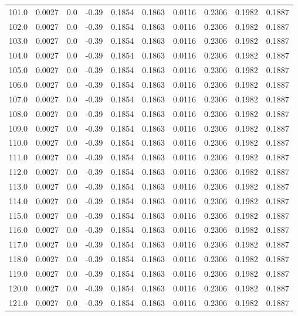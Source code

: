 \begin{longtable}{lrrrrrrrrr}
101.0 & 0.0027 & 0.0 & -0.39 & 0.1854 & 0.1863 & 0.0116 & 0.2306 & 0.1982 & 0.1887 \\
102.0 & 0.0027 & 0.0 & -0.39 & 0.1854 & 0.1863 & 0.0116 & 0.2306 & 0.1982 & 0.1887 \\
103.0 & 0.0027 & 0.0 & -0.39 & 0.1854 & 0.1863 & 0.0116 & 0.2306 & 0.1982 & 0.1887 \\
104.0 & 0.0027 & 0.0 & -0.39 & 0.1854 & 0.1863 & 0.0116 & 0.2306 & 0.1982 & 0.1887 \\
105.0 & 0.0027 & 0.0 & -0.39 & 0.1854 & 0.1863 & 0.0116 & 0.2306 & 0.1982 & 0.1887 \\
106.0 & 0.0027 & 0.0 & -0.39 & 0.1854 & 0.1863 & 0.0116 & 0.2306 & 0.1982 & 0.1887 \\
107.0 & 0.0027 & 0.0 & -0.39 & 0.1854 & 0.1863 & 0.0116 & 0.2306 & 0.1982 & 0.1887 \\
108.0 & 0.0027 & 0.0 & -0.39 & 0.1854 & 0.1863 & 0.0116 & 0.2306 & 0.1982 & 0.1887 \\
109.0 & 0.0027 & 0.0 & -0.39 & 0.1854 & 0.1863 & 0.0116 & 0.2306 & 0.1982 & 0.1887 \\
110.0 & 0.0027 & 0.0 & -0.39 & 0.1854 & 0.1863 & 0.0116 & 0.2306 & 0.1982 & 0.1887 \\
111.0 & 0.0027 & 0.0 & -0.39 & 0.1854 & 0.1863 & 0.0116 & 0.2306 & 0.1982 & 0.1887 \\
112.0 & 0.0027 & 0.0 & -0.39 & 0.1854 & 0.1863 & 0.0116 & 0.2306 & 0.1982 & 0.1887 \\
113.0 & 0.0027 & 0.0 & -0.39 & 0.1854 & 0.1863 & 0.0116 & 0.2306 & 0.1982 & 0.1887 \\
114.0 & 0.0027 & 0.0 & -0.39 & 0.1854 & 0.1863 & 0.0116 & 0.2306 & 0.1982 & 0.1887 \\
115.0 & 0.0027 & 0.0 & -0.39 & 0.1854 & 0.1863 & 0.0116 & 0.2306 & 0.1982 & 0.1887 \\
116.0 & 0.0027 & 0.0 & -0.39 & 0.1854 & 0.1863 & 0.0116 & 0.2306 & 0.1982 & 0.1887 \\
117.0 & 0.0027 & 0.0 & -0.39 & 0.1854 & 0.1863 & 0.0116 & 0.2306 & 0.1982 & 0.1887 \\
118.0 & 0.0027 & 0.0 & -0.39 & 0.1854 & 0.1863 & 0.0116 & 0.2306 & 0.1982 & 0.1887 \\
119.0 & 0.0027 & 0.0 & -0.39 & 0.1854 & 0.1863 & 0.0116 & 0.2306 & 0.1982 & 0.1887 \\
120.0 & 0.0027 & 0.0 & -0.39 & 0.1854 & 0.1863 & 0.0116 & 0.2306 & 0.1982 & 0.1887 \\
121.0 & 0.0027 & 0.0 & -0.39 & 0.1854 & 0.1863 & 0.0116 & 0.2306 & 0.1982 & 0.1887 \\

\end{longtable}
